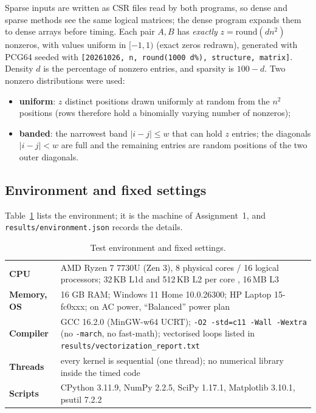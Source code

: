 \documentclass[11pt,a4paper]{article}
\newcommand{\concept}[1]{\par\addvspace{8pt}\Needspace{5\baselineskip}%
  \noindent{\color{accent}\bfseries\boldmath #1}\par\nopagebreak\vspace{2pt}}
\begin{document}
\concept{Part B}
Sparse inputs are written as CSR files read by both programs, so dense and sparse methods see the
same logical matrices; the dense program expands them to dense arrays before timing. Each pair
$A,B$ has \emph{exactly} $z=\mathrm{round}(dn^2)$ nonzeros, with values uniform in $[-1,1)$
(exact zeros redrawn), generated with PCG64 seeded with
\texttt{[20261026, n, round(1000\,d\%), structure, matrix]}. Density $d$ is the percentage of
nonzero entries, and sparsity is $100-d$. Two nonzero distributions were used:
\begin{itemize}[leftmargin=1.4em]
  \item \textbf{uniform}: $z$ distinct positions drawn uniformly at random from the $n^2$
        positions (rows therefore hold a binomially varying number of nonzeros);
  \item \textbf{banded}: the narrowest band $|i-j|\le w$ that can hold $z$ entries; the diagonals
        $|i-j|<w$ are full and the remaining entries are random positions of the two outer
        diagonals.
\end{itemize}

\subsection{Environment and fixed settings}
Table~\ref{tab:env} lists the environment; it is the machine of Assignment~1, and
\texttt{results/environment.json} records the details.

\begin{table}[H]
\centering
\caption{Test environment and fixed settings.}
\label{tab:env}
\begin{tabularx}{\linewidth}{@{}>{\bfseries\color{accent}}l X@{}}
\toprule
CPU & AMD Ryzen 7 7730U (Zen 3), 8 physical cores / 16 logical processors; 32\,KB L1d and 512\,KB L2 per core \cite{amd}, 16\,MB L3 \\
Memory, OS & 16 GB RAM; Windows 11 Home 10.0.26300; HP Laptop 15-fc0xxx; on AC power, ``Balanced'' power plan \\
Compiler & GCC 16.2.0 (MinGW-w64 UCRT); \texttt{-O2 -std=c11 -Wall -Wextra} (no \texttt{-march}, no fast-math); vectorised loops listed in \texttt{results/vectorization\_report.txt} \\
Threads & every kernel is sequential (one thread); no numerical library inside the timed code \\
Scripts & CPython 3.11.9, NumPy 2.2.5, SciPy 1.17.1, Matplotlib 3.10.1, psutil 7.2.2 \\
\bottomrule
\end{tabularx}
\end{table}
\end{document}

